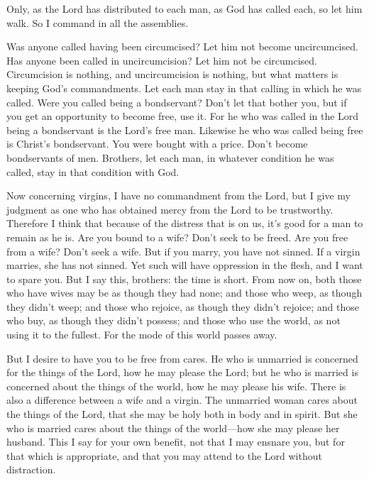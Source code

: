  Only, as the Lord has distributed to each man, as God
has called each, so let him walk. So I command in all the assemblies.

 Was anyone called having been circumcised? Let him not
become uncircumcised. Has anyone been called in uncircumcision? Let him
not be circumcised.  Circumcision is nothing, and
uncircumcision is nothing, but what matters is keeping God's
commandments.  Let each man stay in that calling in which
he was called.  Were you called being a bondservant?
Don't let that bother you, but if you get an opportunity to become free,
use it.  For he who was called in the Lord being a
bondservant is the Lord's free man. Likewise he who was called being
free is Christ's bondservant.  You were bought with a
price. Don't become bondservants of men.  Brothers, let
each man, in whatever condition he was called, stay in that condition
with God.

 Now concerning virgins, I have no commandment from the
Lord, but I give my judgment as one who has obtained mercy from the Lord
to be trustworthy.  Therefore I think that because of the
distress that is on us, it's good for a man to remain as he is.
 Are you bound to a wife? Don't seek to be freed. Are you
free from a wife? Don't seek a wife.  But if you marry,
you have not sinned. If a virgin marries, she has not sinned. Yet such
will have oppression in the flesh, and I want to spare you.
 But I say this, brothers: the time is short. From now
on, both those who have wives may be as though they had none;
 and those who weep, as though they didn't weep; and
those who rejoice, as though they didn't rejoice; and those who buy, as
though they didn't possess;  and those who use the world,
as not using it to the fullest. For the mode of this world passes away.

 But I desire to have you to be free from cares. He who
is unmarried is concerned for the things of the Lord, how he may please
the Lord;  but he who is married is concerned about the
things of the world, how he may please his wife.  There
is also a difference between a wife and a virgin. The unmarried woman
cares about the things of the Lord, that she may be holy both in body
and in spirit. But she who is married cares about the things of the
world---how she may please her husband.  This I say for
your own benefit, not that I may ensnare you, but for that which is
appropriate, and that you may attend to the Lord without distraction.

